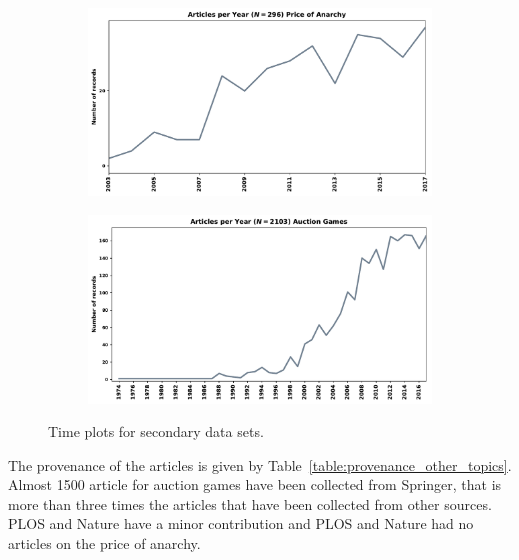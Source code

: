 \documentclass{article}
\theoremstyle{definition}
\begin{document}
\begin{center}
\begin{figure}[!hbtp]
    \begin{subfigure}{0.5\textwidth}
        \includegraphics[width=\textwidth]{./assets/images/anarchy_timeline.pdf}
    \end{subfigure}
    \begin{subfigure}{0.5\textwidth}
        \includegraphics[width=\textwidth]{./assets/images/auction_timeline.pdf}
    \end{subfigure}
\caption{Time plots for secondary data sets.} %
\label{fig:timeplots_other_topics}
\end{figure}
\end{center}

The provenance of the articles is given by Table~\ref{table:provenance_other_topics}.
Almost 1500 article for auction games have been collected from Springer, that is
more than three times the articles that have been collected from other sources.
PLOS and Nature have a minor contribution and PLOS and Nature had no
articles on the price of anarchy.
\end{document}
